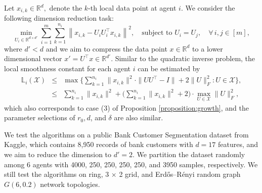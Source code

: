 \documentclass{article}
\newcommand{\cX}{\mathcal{X}}
\newcommand{\bL}{\mathbb{L}}
\newcommand{\RR}{\mathbb{R}}
\begin{document}
 
\vspace{0.5cm}
 Let \( {x}_{i,k} \in \mathbb{R}^d, \) denote the $k$-th local data point at agent $i$. We consider the following dimension reduction task:
\begin{equation}
\min_{U_i\in\RR^{d\times d'}} \sum_{i=1}^m \sum_{k=1}^{n_i} \left\| {x}_{i,k} - U_i U_i^\top {x}_{i,k} \right\|^2, \quad \text{subject to } {U}_i = U_j, \quad \forall\, i,j \in [m],
\end{equation}
where $d'<d$ and we aim to compress the data point $x\in\RR^d$ to a lower dimensional vector $x'=U^\top x\in\RR^{d'}$. Similar to the quadratic inverse problem, the local smoothness constant for each agent $i$ can be estimated by 
\begin{eqnarray}
\bL_i(\cX) &\leq& \max\bigg\{ \sum_{k=1}^{n_i}\|x_{i,k}\|^2\cdot\|UU^\top-I\|+2\|U\|^2_{F} : U\in\cX\bigg\}, \nonumber\\
 & \leq & \sum_{k=1}^{n_i}\|x_{i,k}\|^2+ \Big(\sum_{k=1}^{n_i}\|x_{i,k}\|^2+2\Big)\cdot\max_{U\in\mathcal{X}}\|U\|^2_F, \nonumber
\end{eqnarray}
which also corresponds to case (3) of Proposition \ref{proposition:growth},
and the parameter selections of $r_0, d$, and $\delta$ are also similar. 

We test the algorithms on a public Bank Customer Segmentation dataset from Kaggle, which contains 8,950 records of bank customers with $d=17$ features, and we aim to reduce the dimension to $d'=2$. We partition the dataset randomly among 6 agents with 4000, 250, 250, 250, 250, and 3950 samples, respectively.  We still test the algorithms on ring, 3 × 2 grid, and Erdős–Rényi random graph $G(6,0.2)$ network topologies.
\end{document}
